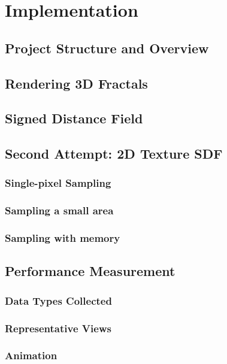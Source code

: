 \chapter{Implementation}
\label{chapter3}

\section{Project Structure and Overview}

\section{Rendering 3D Fractals}

\section{Signed Distance Field}

\section{Second Attempt: 2D Texture SDF}

\subsection{Single-pixel Sampling}

\subsection{Sampling a small area}

\subsection{Sampling with memory}

\section{Performance Measurement}

\subsection{Data Types Collected}

\subsection{Representative Views}

\subsection{Animation}